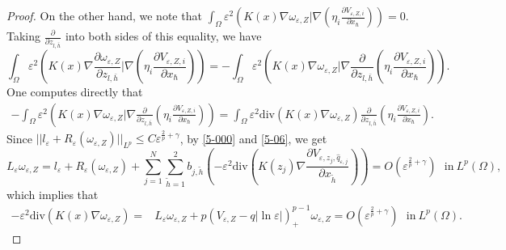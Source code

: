 \documentclass[12pt,reqno]{amsart}
\numberwithin{equation}{section}
\theoremstyle{definition}
\theoremstyle{remark}
\begin{document}
\begin{proof}
On the other hand, we note that   $ \int_{\Omega}\varepsilon^2\left (K(x) \nabla\omega_{\varepsilon,Z}| \nabla \left( \eta_i\frac{\partial V_{\varepsilon, Z,i}}{\partial x_\hbar}\right)\right )=0$. Taking $ \frac{\partial}{\partial z_{l,\bar{h}}} $ into both sides of this equality, we have
\begin{equation}\label{5-12}
\int_{\Omega}\varepsilon^2 \left (K(x) \nabla \frac{\partial \omega_{\varepsilon,Z} }{\partial z_{l,\bar{h}}}| \nabla \left( \eta_i\frac{\partial V_{\varepsilon, Z,i}}{\partial x_\hbar}\right)\right )=-\int_{\Omega} \varepsilon^2 \left (K(x) \nabla\omega_{\varepsilon,Z}| \nabla \frac{\partial  }{\partial z_{l,\bar{h}}}\left( \eta_i\frac{\partial V_{\varepsilon, Z,i}}{\partial x_\hbar}\right)\right ) .
\end{equation}
One computes directly  that
\begin{equation}\label{5-13}
\begin{split}
-\int_{\Omega} \varepsilon^2 \left (K(x) \nabla\omega_{\varepsilon,Z}| \nabla \frac{\partial  }{\partial z_{l,\bar{h}}}\left( \eta_i\frac{\partial V_{\varepsilon, Z,i}}{\partial x_\hbar}\right)\right )=\int_{\Omega} \varepsilon^2 \text{div} \left (K(x) \nabla\omega_{\varepsilon,Z}  \right )\frac{\partial  }{\partial z_{l,\bar{h}}}\left( \eta_i\frac{\partial V_{\varepsilon, Z,i}}{\partial x_\hbar}\right).
\end{split}
\end{equation}
Since $ ||l_\varepsilon+R_\varepsilon(\omega_{\varepsilon,Z})||_{L^p}\leq C\varepsilon^{\frac{2}{p}+\gamma} $, by \eqref{5-000}  and \eqref{5-06}, we get
\begin{equation*}
L_\varepsilon \omega_{\varepsilon,Z}= l_\varepsilon+  R_\varepsilon(\omega_{\varepsilon,Z})+\sum_{j=1}^N\sum_{\tilde{h}=1}^2b_{j,\tilde{h}}\left( -\varepsilon^2\text{div}\left (K(z_j)\nabla   \frac{\partial V_{\varepsilon, z_j, \hat{q}_{\varepsilon,j}}}{\partial x_{\tilde{h}}}\right )\right)=O\left( \varepsilon^{\frac{2}{p}+\gamma}\right) \  \ \ \text{in}\ L^p(\Omega),
\end{equation*}
which implies that
\begin{equation*}
\begin{split}
-\varepsilon^2 \text{div}\left (K(x) \nabla\omega_{\varepsilon,Z}  \right )=&L_\varepsilon \omega_{\varepsilon,Z}
+p\left( V_{\varepsilon,Z}-q|\ln\varepsilon|\right)^{p-1}_+\omega_{\varepsilon,Z}
= O\left( \varepsilon^{\frac{2}{p}+\gamma}\right) \  \ \ \text{in}\ L^p(\Omega).
\end{split}
\end{equation*}

\end{proof}
\end{document}
